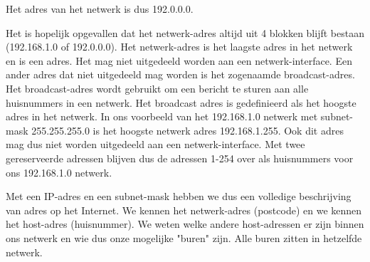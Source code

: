 Het adres van het netwerk is dus 192.0.0.0.

Het is hopelijk opgevallen dat het netwerk-adres altijd uit 4 blokken blijft bestaan (192.168.1.0 of 192.0.0.0). Het netwerk-adres is het laagste adres in het netwerk en is een  adres. Het mag niet uitgedeeld worden aan een netwerk-interface. Een ander adres dat niet uitgedeeld mag worden is het zogenaamde broadcast-adres. Het broadcast-adres wordt gebruikt om een bericht te sturen aan alle huisnummers in een netwerk. Het broadcast adres is gedefinieerd als het hoogste adres in het netwerk. In ons voorbeeld van het 192.168.1.0 netwerk met subnet-mask 255.255.255.0 is het hoogste netwerk adres 192.168.1.255. Ook dit adres mag dus niet worden uitgedeeld aan een netwerk-interface. Met twee gereserveerde adressen blijven dus de adressen 1-254 over als huisnummers voor ons 192.168.1.0 netwerk.

Met een IP-adres en een subnet-mask hebben we dus een volledige beschrijving van adres op het Internet. We kennen het netwerk-adres (postcode) en we kennen het host-adres (huisnummer). We weten welke andere host-adressen er zijn binnen ons netwerk en wie dus onze mogelijke "buren" zijn. Alle buren zitten in hetzelfde netwerk.
